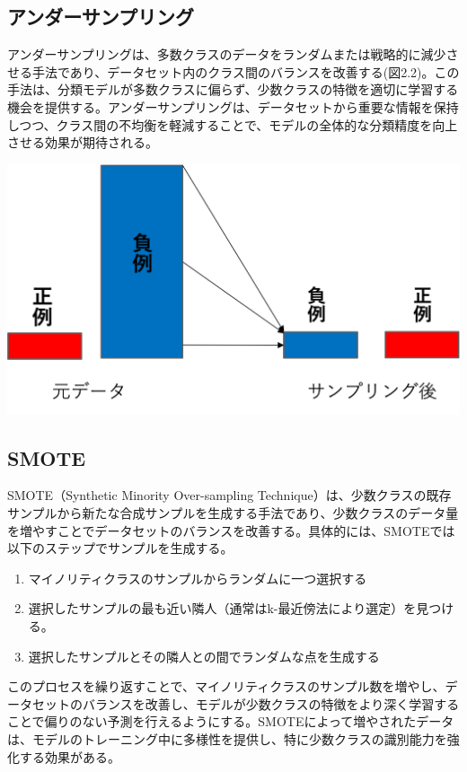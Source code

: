\documentclass[platex]{suribt}
\begin{document}
\subsection{アンダーサンプリング}
アンダーサンプリングは、多数クラスのデータをランダムまたは戦略的に減少させる手法であり、データセット内のクラス間のバランスを改善する(図2.2)。この手法は、分類モデルが多数クラスに偏らず、少数クラスの特徴を適切に学習する機会を提供する。アンダーサンプリングは、データセットから重要な情報を保持しつつ、クラス間の不均衡を軽減することで、モデルの全体的な分類精度を向上させる効果が期待される。

\includegraphics[scale=0.6]{undersampling.png}
\subsection{SMOTE}
SMOTE（Synthetic Minority Over-sampling Technique）は、少数クラスの既存サンプルから新たな合成サンプルを生成する手法であり、少数クラスのデータ量を増やすことでデータセットのバランスを改善する。具体的には、SMOTEでは以下のステップでサンプルを生成する。

\begin{enumerate}
   \item マイノリティクラスのサンプルからランダムに一つ選択する
   \item 選択したサンプルの最も近い隣人（通常はk-最近傍法により選定）を見つける。
   \item 選択したサンプルとその隣人との間でランダムな点を生成する
\end{enumerate}

このプロセスを繰り返すことで、マイノリティクラスのサンプル数を増やし、データセットのバランスを改善し、モデルが少数クラスの特徴をより深く学習することで偏りのない予測を行えるようにする。SMOTEによって増やされたデータは、モデルのトレーニング中に多様性を提供し、特に少数クラスの識別能力を強化する効果がある。
\end{document}
